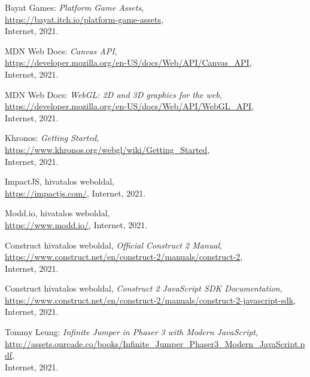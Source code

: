 \begin{thebibliography}{x}
	Bayat Games: \emph{Platform Game Assets}, \\
	\url{https://bayat.itch.io/platform-game-assets}, \\
	Internet, 2021.
	
	MDN Web Docs: \emph{Canvas API}, \\
	\url{https://developer.mozilla.org/en-US/docs/Web/API/Canvas_API}, \\
	Internet, 2021.
	
	MDN Web Docs: \emph{WebGL: 2D and 3D graphics for the web}, \\
	\url{https://developer.mozilla.org/en-US/docs/Web/API/WebGL_API}, \\
	Internet, 2021.
	
	Khronos: \emph{Getting Started}, \\
	\url{https://www.khronos.org/webgl/wiki/Getting_Started}, \\
	Internet, 2021.
	
	ImpactJS, hivatalos weboldal, \\
	\url{https://impactjs.com/},
	Internet, 2021.
	
	Modd.io, hivatalos weboldal, \\
	\url{https://www.modd.io/},
	Internet, 2021.
	
	Construct hivatalos weboldal, \emph{Official Construct 2 Manual}, \\
	\url{https://www.construct.net/en/construct-2/manuals/construct-2}, \\
	Internet, 2021.
	
	Construct hivatalos weboldal, \emph{Construct 2 JavaScript SDK Documentation}, \\
	\url{https://www.construct.net/en/construct-2/manuals/construct-2-javascript-sdk}, \\
	Internet, 2021.
	
	Tommy Leung: \emph{Infinite Jumper in Phaser 3 with Modern JavaScript}, \\
	\url{http://assets.ourcade.co/books/Infinite_Jumper_Phaser3_Modern_JavaScript.pdf}, \\
	Internet, 2021.
	

\end{thebibliography}
